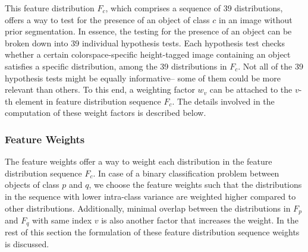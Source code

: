 \documentclass {udthesis}
\begin{document}
This feature distribution $F_c$, which comprises a sequence of 39 distributions, offers a way to test for the presence of an object of class $c$ in an image without prior segmentation. In essence, the testing for the presence of an object can be broken down into 39 individual hypothesis tests. Each hypothesis test checks whether a certain colorspace-specific height-tagged image containing an object satisfies a specific distribution, among the 39 distributions in $F_c$. Not all of the 39 hypothesis tests might be equally informative-- some of them could be more relevant than others. To this end, a weighting factor $w_{v}$ can be attached to the $v$-th element in feature distribution sequence $F_c$.  The details involved in the computation of these weight factors is described below.

\subsubsection{Feature Weights}
\label{sec:distdes_feat_wts}

The feature weights offer a way to weight each distribution in the feature distribution sequence $F_c$. In case of a binary classification problem between objects of class $p$ and $q$, we choose the feature weights such that the distributions in the sequence with lower intra-class variance are weighted higher compared to other distributions. Additionally, minimal overlap between the distributions in $F_p$ and $F_q$ with same index $v$ is also another factor that increases the weight. In the rest of this section the formulation of these feature distribution sequence weights is discussed.
\end{document}
